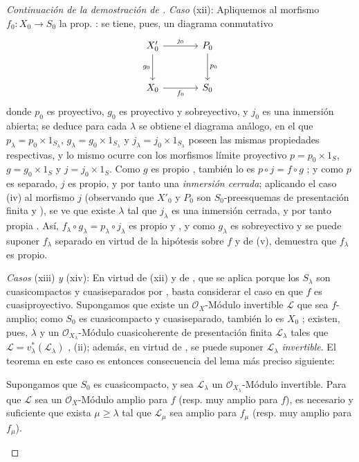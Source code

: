 \begin{proof}[Continuación de la demostración de ]
\emph{Caso} (xii): Apliquemos al morfismo $f_0:X_0\to S_0$ la prop. : se tiene, pues, un diagrama conmutativo
\[
\begin{tikzcd}[column sep=large,row sep=large]
X'_0 \arrow[r,"j_0"] \arrow[d,"g_0"'] & P_0 \arrow[d,"p_0"] \\
X_0 \arrow[r,"f_0"'] & S_0
\end{tikzcd}
\]
donde $p_0$ es proyectivo, $g_0$ es proyectivo y sobreyectivo, y $j_0$ es una inmersión abierta; se deduce para cada $\lambda$ se obtiene el diagrama análogo, en el que $p_\lambda=p_0\times1_{S_\lambda}$, $g_\lambda=g_0\times1_{S_\lambda}$ y $j_\lambda=j_0\times1_{S_\lambda}$ poseen las mismas propiedades respectivas, y lo mismo ocurre con los morfismos límite proyectivo $p=p_0\times1_S$, $g=g_0\times1_S$ y $j=j_0\times1_S$. Como $g$ es propio , también lo es $p\circ j=f\circ g$ ; y como $p$ es separado, $j$ es propio, y por tanto una \emph{inmersión cerrada}; aplicando el caso (iv) al morfismo $j$ (observando que $X'_0$ y $P_0$ son $S_0$-preesquemas de presentación finita  y ), se ve que existe $\lambda$ tal que $j_\lambda$ es una inmersión cerrada, y por tanto propia . Así,
$f_\lambda\circ g_\lambda=p_\lambda\circ j_\lambda$ es propio  y , y como $g_\lambda$ es sobreyectivo y se puede suponer $f_\lambda$ separado en virtud de la hipótesis sobre $f$ y de (v),  demuestra que $f_\lambda$ es propio.

\emph{Casos} (xiii) \emph{y} (xiv): En virtud de (xii) y de , que se aplica porque los $S_\lambda$ son cuasicompactos y cuasiseparados por , basta
considerar el caso en que $f$ es cuasiproyectivo. Supongamos que existe un $\mathcal O_X$-Módulo invertible $\mathcal L$ que sea $f$-amplio; como $S_0$ es cuasicompacto y cuasiseparado, también lo es $X_0$ ; existen, pues, $\lambda$ y un $\mathcal O_{X_\lambda}$-Módulo cuasicoherente de presentación finita $\mathcal L_\lambda$ tales que $\mathcal L=v_\lambda^*(\mathcal L_\lambda)$ , (ii); además, en virtud de , se puede suponer $\mathcal L_\lambda$ \emph{invertible}. El teorema en este caso es entonces consecuencia del lema más preciso siguiente:

\begin{lemma}[8.10.5.2]
\label{IV.8.10.5.2-fr}
Supongamos que $S_0$ es cuasicompacto, y sea $\mathcal L_\lambda$ un
$\mathcal O_{X_\lambda}$-Módulo invertible. Para que $\mathcal L$ sea un
$\mathcal O_X$-Módulo amplio para $f$ \textup{(resp.} muy amplio para $f$\textup{)}, es necesario y
suficiente que exista $\mu\geq\lambda$ tal que $\mathcal L_\mu$ sea amplio
para $f_\mu$ \textup{(resp.} muy amplio para $f_\mu$\textup{)}.
\end{lemma}


\end{proof}
